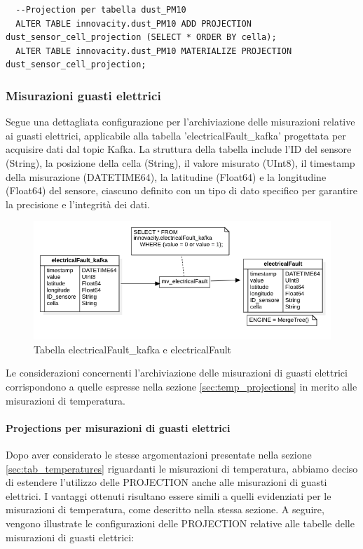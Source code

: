 \begin{lstlisting}
  --Projection per tabella dust_PM10
  ALTER TABLE innovacity.dust_PM10 ADD PROJECTION dust_sensor_cell_projection (SELECT * ORDER BY cella);
  ALTER TABLE innovacity.dust_PM10 MATERIALIZE PROJECTION dust_sensor_cell_projection;
\end{lstlisting}

\subsubsection{Misurazioni guasti elettrici} \label{sec:tab_guasti}
Segue una dettagliata configurazione per l'archiviazione delle misurazioni relative ai guasti elettrici, applicabile alla tabella 'electricalFault\_kafka' progettata per acquisire dati dal topic Kafka. La struttura della tabella include l'ID del sensore (String), la posizione della cella (String), il valore misurato (UInt8), il timestamp della misurazione (DATETIME64), la latitudine (Float64) e la longitudine (Float64) del sensore, ciascuno definito con un tipo di dato specifico per garantire la precisione e l'integrità dei dati.

\begin{figure}[H]
    \centering
    \includegraphics[width=1\textwidth]{../Images/SpecificaTecnica/electricalFault.png}
    \caption{Tabella electricalFault\_kafka e electricalFault}
    \label{fig:electricalFault_tables}
  \end{figure}

Le considerazioni concernenti l'archiviazione delle misurazioni di guasti elettrici corrispondono a quelle espresse nella sezione \ref{sec:temp_projections} in merito alle misurazioni di temperatura.

\paragraph{Projections per misurazioni di guasti elettrici} 
Dopo aver considerato le stesse argomentazioni presentate nella sezione \ref{sec:tab_temperatures} riguardanti le misurazioni di temperatura, abbiamo deciso di estendere l'utilizzo delle PROJECTION anche alle misurazioni di guasti elettrici. I vantaggi ottenuti risultano essere simili a quelli evidenziati per le misurazioni di temperatura, come descritto nella stessa sezione. A seguire, vengono illustrate le configurazioni delle PROJECTION relative alle tabelle delle misurazioni di guasti elettrici:

